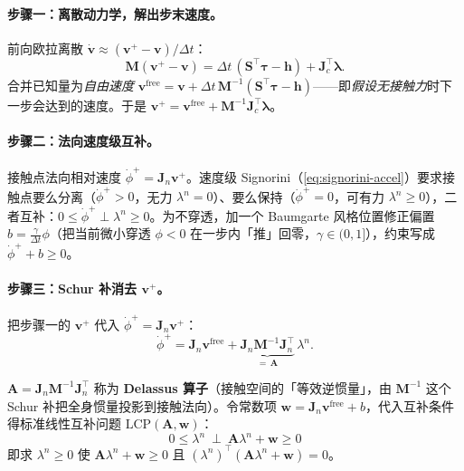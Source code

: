 \paragraph{步骤一：离散动力学，解出步末速度。}
前向欧拉离散 $\dot{\boldsymbol{v}}\approx(\boldsymbol{v}^+-\boldsymbol{v})/\Delta t$：
\[
\mathbf{M}(\boldsymbol{v}^+-\boldsymbol{v})=\Delta t\,(\mathbf{S}^\top\boldsymbol{\tau}-\boldsymbol{h})+\mathbf{J}_c^\top\boldsymbol{\lambda}.
\]
合并已知量为\emph{自由速度} $\boldsymbol{v}^{\mathrm{free}}=\boldsymbol{v}+\Delta t\,\mathbf{M}^{-1}(\mathbf{S}^\top\boldsymbol{\tau}-\boldsymbol{h})$——即\emph{假设无接触力}时下一步会达到的速度。于是 $\boldsymbol{v}^+=\boldsymbol{v}^{\mathrm{free}}+\mathbf{M}^{-1}\mathbf{J}_c^\top\boldsymbol{\lambda}$。

\paragraph{步骤二：法向速度级互补。}
接触点法向相对速度 $\dot\phi^+=\mathbf{J}_n\boldsymbol{v}^+$。速度级 Signorini（\cref{eq:signorini-accel}）要求接触点要么分离（$\dot\phi^+>0$，无力 $\lambda^n=0$）、要么保持（$\dot\phi^+=0$，可有力 $\lambda^n\ge0$），二者互补：$0\le\dot\phi^+\perp\lambda^n\ge0$。为不穿透，加一个 Baumgarte 风格位置修正偏置 $b=\tfrac{\gamma}{\Delta t}\phi$（把当前微小穿透 $\phi<0$ 在一步内「推」回零，$\gamma\in(0,1]$），约束写成 $\dot\phi^++b\ge0$。

\paragraph{步骤三：Schur 补消去 $\boldsymbol{v}^+$。}
把步骤一的 $\boldsymbol{v}^+$ 代入 $\dot\phi^+=\mathbf{J}_n\boldsymbol{v}^+$：
\begin{equation}
  \dot\phi^+=\mathbf{J}_n\boldsymbol{v}^{\mathrm{free}}+\underbrace{\mathbf{J}_n\mathbf{M}^{-1}\mathbf{J}_n^\top}_{=\,\mathbf{A}}\,\lambda^n.
  \label{eq:delassus-substitution}
\end{equation}

\begin{definition}
\label{def:delassus}
$\mathbf{A}=\mathbf{J}_n\mathbf{M}^{-1}\mathbf{J}_n^\top$ 称为 \textbf{Delassus 算子}（接触空间的「等效逆惯量」，由 $\mathbf{M}^{-1}$ 这个 Schur 补把全身惯量投影到接触法向）。令常数项 $\boldsymbol{w}=\mathbf{J}_n\boldsymbol{v}^{\mathrm{free}}+b$，代入互补条件得标准线性互补问题 $\mathrm{LCP}(\mathbf{A},\boldsymbol{w})$：
\begin{equation}
  \boxed{\ 0\le\lambda^n\ \perp\ \mathbf{A}\lambda^n+\boldsymbol{w}\ge0\ }
  \label{eq:lcp-standard}
\end{equation}
即求 $\lambda^n\ge0$ 使 $\mathbf{A}\lambda^n+\boldsymbol{w}\ge0$ 且 $(\lambda^n)^\top(\mathbf{A}\lambda^n+\boldsymbol{w})=0$。
\end{definition}

